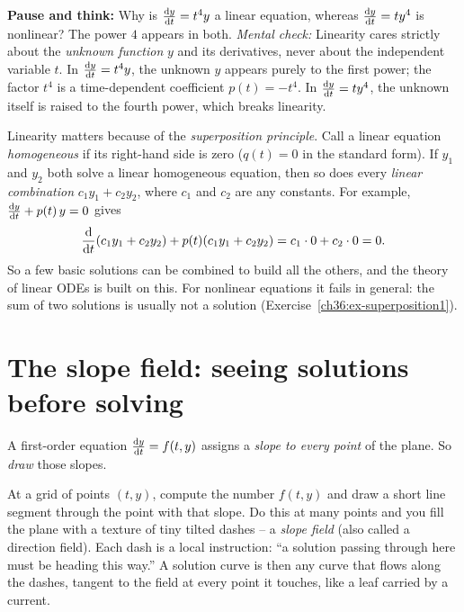 \begin{recoverybox}
\textbf{Pause and think:} Why is $\frac{\mathrm{d} y}{\mathrm{d} t} = t^4 y$ a linear equation, whereas $\frac{\mathrm{d} y}{\mathrm{d} t} = t y^4$ is nonlinear? The power $4$ appears in both.
\emph{Mental check:} Linearity cares strictly about the \emph{unknown function} $y$ and its derivatives, never about the independent variable $t$. In $\frac{\mathrm{d} y}{\mathrm{d} t} = t^4 y$, the unknown $y$ appears purely to the first power; the factor $t^4$ is a time-dependent coefficient $p(t) = -t^4$. In $\frac{\mathrm{d} y}{\mathrm{d} t} = t y^4$, the unknown itself is raised to the fourth power, which breaks linearity.
\end{recoverybox}

\begin{aestheticbox}
Linearity matters because of the \emph{superposition principle}. Call a linear equation \emph{homogeneous} if its right-hand side is zero ($q(t)=0$ in the standard form). If $y_1$ and $y_2$ both solve a linear homogeneous equation, then so does every \emph{linear combination} $c_1 y_1 + c_2 y_2$, where $c_1$ and $c_2$ are any constants. For example, $\frac{\mathrm{d} y}{\mathrm{d} t} + p(t)\,y = 0$ gives
\[
  \frac{\mathrm{d} }{\mathrm{d} t}(c_1y_1 + c_2y_2) + p(t)(c_1y_1 + c_2y_2) = c_1\cdot 0 + c_2 \cdot 0 = 0.
\]
So a few basic solutions can be combined to build all the others, and the theory of linear ODEs is built on this. For nonlinear equations it fails in general: the sum of two solutions is usually not a solution (Exercise~\ref{ch36:ex-superposition1}).
\end{aestheticbox}

\section{The slope field: seeing solutions before solving}
\label{ch36:sec-slopefield}

A first-order equation $\frac{\mathrm{d} y}{\mathrm{d} t} = f(t,y)$ assigns a \emph{slope to every point} of the plane. So \emph{draw} those slopes.

At a grid of points $(t,y)$, compute the number $f(t,y)$ and draw a short line segment through the point with that slope. Do this at many points and you fill the plane with a texture of tiny tilted dashes -- a \emph{slope field} (also called a direction field). Each dash is a local instruction: ``a solution passing through here must be heading this way.'' A solution curve is then any curve that flows along the dashes, tangent to the field at every point it touches, like a leaf carried by a current.

